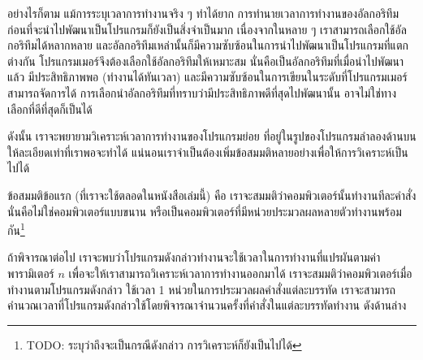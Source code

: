 อย่างไรก็ตาม แม้{\wbr}การ{\wbr}ระบุ{\wbr}เวลา{\wbr}การ{\wbr}ทำงาน{\wbr}จริง ๆ ทำ{\wbr}ได้{\wbr}ยาก{\wbr}
การ{\wbr}ทำนาย{\wbr}เวลา{\wbr}การ{\wbr}ทำงาน{\wbr}ของ{\wbr}อัล{\wbr}กอ{\wbr}ริ{\wbr}ทึม{\wbr}ก่อน{\wbr}ที่{\wbr}จะ{\wbr}นำ{\wbr}ไป{\wbr}พัฒนา{\wbr}เป็น{\wbr}โปรแกรม{\wbr}ก็{\wbr}ยัง{\wbr}เป็น{\wbr}สิ่ง{\wbr}จำเป็น{\wbr}มาก{\wbr}
เนื่องจาก{\wbr}ใน{\wbr}หลาย ๆ เรา{\wbr}สามารถ{\wbr}เลือก{\wbr}ใช้{\wbr}อัล{\wbr}กอ{\wbr}ริ{\wbr}ทึม{\wbr}ได้{\wbr}หลากหลาย{\wbr}
และ{\wbr}อัล{\wbr}กอ{\wbr}ริ{\wbr}ทึม{\wbr}เหล่านั้น{\wbr}ก็{\wbr}มี{\wbr}ความ{\wbr}ซับซ้อน{\wbr}ใน{\wbr}การ{\wbr}นำ{\wbr}ไป{\wbr}พัฒนา{\wbr}เป็น{\wbr}โปรแกรม{\wbr}ที่{\wbr}แตกต่าง{\wbr}กัน{\wbr}
โปรแกรมเมอร์{\wbr}จึง{\wbr}ต้อง{\wbr}เลือก{\wbr}ใช้{\wbr}อัล{\wbr}กอ{\wbr}ริ{\wbr}ทึม{\wbr}ให้{\wbr}เหมาะสม นั่น{\wbr}คือ{\wbr}เป็น{\wbr}อัล{\wbr}กอ{\wbr}ริ{\wbr}ทึม{\wbr}ที่{\wbr}เมื่อ{\wbr}นำ{\wbr}ไป{\wbr}พัฒนา{\wbr}แล้ว{\wbr}
มี{\wbr}ประสิทธิภาพ{\wbr}พอ (ทำงาน{\wbr}ได้{\wbr}ทัน{\wbr}เวลา)
และ{\wbr}มี{\wbr}ความ{\wbr}ซับซ้อน{\wbr}ใน{\wbr}การ{\wbr}เขียน{\wbr}ใน{\wbr}ระดับ{\wbr}ที่{\wbr}โปรแกรมเมอร์{\wbr}สามารถ{\wbr}จัดการ{\wbr}ได้{\wbr}
การ{\wbr}เลือก{\wbr}นำ{\wbr}อัล{\wbr}กอ{\wbr}ริ{\wbr}ทึม{\wbr}ที่{\wbr}ทราบ{\wbr}ว่า{\wbr}มี{\wbr}ประสิทธิภาพ{\wbr}ดี{\wbr}ที่สุด{\wbr}ไป{\wbr}พัฒนา{\wbr}นั้น{\wbr}
อาจ{\wbr}ไม่{\wbr}ใช่{\wbr}ทางเลือก{\wbr}ที่{\wbr}ดี{\wbr}ที่สุด{\wbr}ก็{\wbr}เป็น{\wbr}ได้{\wbr}

ดังนั้น เรา{\wbr}จะ{\wbr}พยายาม{\wbr}วิเคราะห์{\wbr}เวลา{\wbr}การ{\wbr}ทำงาน{\wbr}ของ{\wbr}โปรแกรมย่อย{\wbr}
ที่อยู่{\wbr}ใน{\wbr}รูป{\wbr}ของ{\wbr}โปรแกรม{\wbr}ลำ{\wbr}ลอง{\wbr}ด้าน{\wbr}บน ให้{\wbr}ละเอียด{\wbr}เท่า{\wbr}ที่{\wbr}เรา{\wbr}พอจะ{\wbr}ทำ{\wbr}ได้{\wbr}
แน่นอน{\wbr}เรา{\wbr}จำเป็น{\wbr}ต้อง{\wbr}เพิ่ม{\wbr}ข้อสมมติ{\wbr}หลาย{\wbr}อย่าง{\wbr}เพื่อให้{\wbr}การ{\wbr}วิเคราะห์{\wbr}เป็น{\wbr}ไป{\wbr}ได้{\wbr}

ข้อสมมติ{\wbr}ข้อ{\wbr}แรก (ที่{\wbr}เรา{\wbr}จะ{\wbr}ใช้{\wbr}ตลอด{\wbr}ใน{\wbr}หนังสือ{\wbr}เล่ม{\wbr}นี้) คือ{\wbr}
เรา{\wbr}จะ{\wbr}สมมติ{\wbr}ว่า{\wbr}คอมพิวเตอร์{\wbr}นั้น{\wbr}ทำงาน{\wbr}ทีละ{\wbr}คำสั่ง นั่น{\wbr}คือ{\wbr}ไม่{\wbr}ใช่{\wbr}คอมพิวเตอร์{\wbr}แบบ{\wbr}ขนาน{\wbr}
หรือ{\wbr}เป็น{\wbr}คอมพิวเตอร์{\wbr}ที่{\wbr}มี{\wbr}หน่วย{\wbr}ประมวลผล{\wbr}หลาย{\wbr}ตัว{\wbr}ทำงาน{\wbr}พร้อมกัน\footnote{TODO:
  ระบุ{\wbr}ว่า{\wbr}ถึง{\wbr}จะ{\wbr}เป็น{\wbr}กรณี{\wbr}ดังกล่าว การ{\wbr}วิเคราะห์{\wbr}ก็{\wbr}ยัง{\wbr}เป็น{\wbr}ไป{\wbr}ได้}

ถ้า{\wbr}พิจารณา{\wbr}ต่อไป{\wbr}
เรา{\wbr}จะ{\wbr}พบ{\wbr}ว่า{\wbr}โปรแกรม{\wbr}ดังกล่าว{\wbr}ทำงาน{\wbr}จะ{\wbr}ใช้เวลา{\wbr}ใน{\wbr}การ{\wbr}ทำงาน{\wbr}ที่{\wbr}แปรผัน{\wbr}ตาม{\wbr}ค่า{\wbr}พารามิเตอร์ $n$
เพื่อ{\wbr}จะ{\wbr}ให้{\wbr}เรา{\wbr}สามารถ{\wbr}วิเคราะห์{\wbr}เวลา{\wbr}การ{\wbr}ทำงาน{\wbr}ออก{\wbr}มา{\wbr}ได้{\wbr}
เรา{\wbr}จะ{\wbr}สมมติ{\wbr}ว่า{\wbr}คอมพิวเตอร์{\wbr}เมื่อ{\wbr}ทำงาน{\wbr}ตาม{\wbr}โปรแกรม{\wbr}ดังกล่าว ใช้เวลา 1
หน่วย{\wbr}ใน{\wbr}การ{\wbr}ประมวลผล{\wbr}คำสั่ง{\wbr}แต่ละ{\wbr}บรรทัด{\wbr}
เรา{\wbr}จะ{\wbr}สามารถ{\wbr}คำนวณ{\wbr}เวลา{\wbr}ที่{\wbr}โปรแกรม{\wbr}ดังกล่าว{\wbr}ใช้{\wbr}โดย{\wbr}พิจารณา{\wbr}จำนวน{\wbr}ครั้ง{\wbr}ที่{\wbr}คำสั่ง{\wbr}ใน{\wbr}แต่ละ{\wbr}บรรทัด{\wbr}ทำงาน{\wbr}
ดัง{\wbr}ด้าน{\wbr}ล่าง{\wbr}


